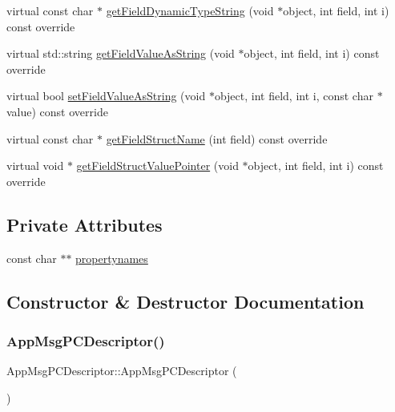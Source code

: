 \begin{DoxyCompactItemize}
\item 
virtual const char $\ast$ \hyperlink{classAppMsgPCDescriptor_a17016d018e18d544b226ecd3119de5b2}{get\+Field\+Dynamic\+Type\+String} (void $\ast$object, int field, int i) const override
\item 
virtual std\+::string \hyperlink{classAppMsgPCDescriptor_ac5f4467bbe2dae35c300f7288bfc4003}{get\+Field\+Value\+As\+String} (void $\ast$object, int field, int i) const override
\item 
virtual bool \hyperlink{classAppMsgPCDescriptor_a8eecfb063c75f3c72ceb3646680b9261}{set\+Field\+Value\+As\+String} (void $\ast$object, int field, int i, const char $\ast$value) const override
\item 
virtual const char $\ast$ \hyperlink{classAppMsgPCDescriptor_a10b8057293b17adac40060a533966cf8}{get\+Field\+Struct\+Name} (int field) const override
\item 
virtual void $\ast$ \hyperlink{classAppMsgPCDescriptor_aaeff42267f2ab084ef76f8bf9eb0eedd}{get\+Field\+Struct\+Value\+Pointer} (void $\ast$object, int field, int i) const override
\end{DoxyCompactItemize}
\subsection*{Private Attributes}
\begin{DoxyCompactItemize}
\item 
const char $\ast$$\ast$ \hyperlink{classAppMsgPCDescriptor_aaeca386eddf80dd71ff4cdd3bb1353a7}{propertynames}
\end{DoxyCompactItemize}


\subsection{Constructor \& Destructor Documentation}
\mbox{\label{classAppMsgPCDescriptor_a3a331f63d98d56b7433d83ad6afd2fa1}} 
\subsubsection{\texorpdfstring{App\+Msg\+P\+C\+Descriptor()}{AppMsgPCDescriptor()}}
{\footnotesize\ttfamily App\+Msg\+P\+C\+Descriptor\+::\+App\+Msg\+P\+C\+Descriptor (\begin{DoxyParamCaption}{ }\end{DoxyParamCaption})}

